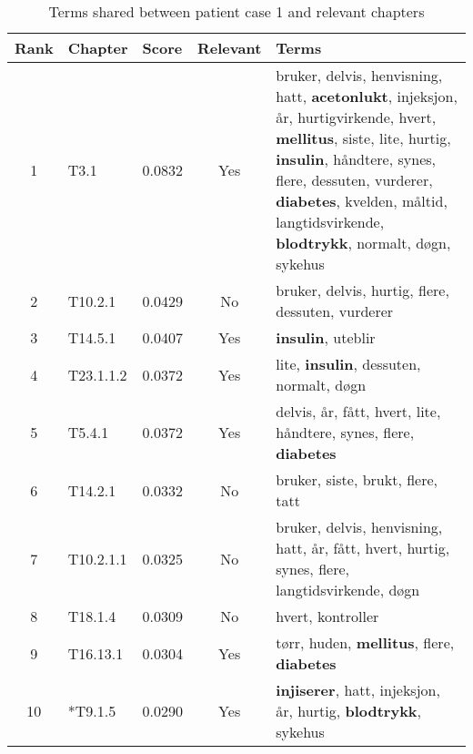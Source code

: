 \begin{table}[htbp] \footnotesize \center
\caption{Terms shared between patient case 1 and relevant chapters\label{tab:terms}}
\begin{tabularx}{\textwidth}{c l l c X}
    \toprule
    Rank & Chapter & Score & Relevant & Terms \\
    \midrule
	1 & T3.1 & 0.0832 & Yes & bruker, delvis, henvisning, hatt, \textbf{acetonlukt}, injeksjon, år, hurtigvirkende, hvert, \textbf{mellitus}, siste, lite, hurtig, \textbf{insulin}, håndtere, synes, flere, dessuten, vurderer, \textbf{diabetes}, kvelden, måltid, langtidsvirkende, \textbf{blodtrykk}, normalt, døgn, sykehus \\
	2 & T10.2.1 & 0.0429 & No & bruker, delvis, hurtig, flere, dessuten, vurderer \\
	3 & T14.5.1 & 0.0407 & Yes & \textbf{insulin}, uteblir \\
	4 & T23.1.1.2 & 0.0372 & Yes & lite, \textbf{insulin}, dessuten, normalt, døgn \\
	5 & T5.4.1 & 0.0372 & Yes & delvis, år, fått, hvert, lite, håndtere, synes, flere, \textbf{diabetes} \\
	6 & T14.2.1 & 0.0332 & No & bruker, siste, brukt, flere, tatt \\
	7 & T10.2.1.1 & 0.0325 & No & bruker, delvis, henvisning, hatt, år, fått, hvert, hurtig, synes, flere, langtidsvirkende, døgn \\
	8 & T18.1.4 & 0.0309 & No & hvert, kontroller \\
	9 & T16.13.1 & 0.0304 & Yes & tørr, huden, \textbf{mellitus}, flere, \textbf{diabetes} \\
	10 & *T9.1.5 & 0.0290 & Yes & \textbf{injiserer}, hatt, injeksjon, år, hurtig, \textbf{blodtrykk}, sykehus \\
	\bottomrule
\end{tabularx}
\end{table}

